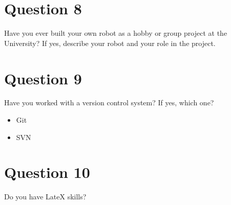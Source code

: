 \section{Question 8}
Have you ever built your own robot as a hobby or group project at the University? If yes, describe your robot and your role in the project.

\section{Question 9}
Have you worked with a version control system? If yes, which one?
\begin{itemize}
\item Git
\item SVN
\end{itemize}

\section{Question 10}
Do you have LateX skills?
